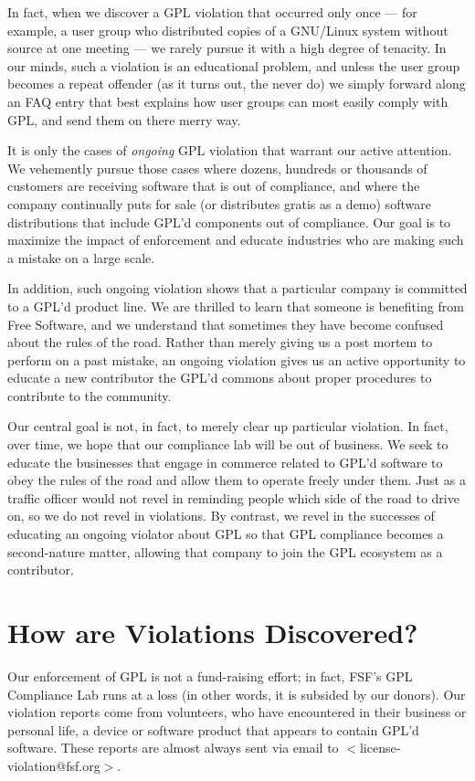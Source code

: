 \documentclass[12pt]{report}
\begin{document}
In fact, when we discover a GPL violation that occurred only once --- for
example, a user group who distributed copies of a GNU/Linux system without
source at one meeting --- we rarely pursue it with a high degree of
tenacity.  In our minds, such a violation is an educational problem, and
unless the user group becomes a repeat offender (as it turns out, the
never do) we simply forward along an FAQ entry that best explains how user
groups can most easily comply with GPL, and send them on there merry way.

It is only the cases of {\em ongoing\/} GPL violation that warrant our
active attention.  We vehemently pursue those cases where dozens, hundreds
or thousands of customers are receiving software that is out of
compliance, and where the company continually puts for sale (or
distributes gratis as a demo) software distributions that include GPL'd
components out of compliance.  Our goal is to maximize the impact of
enforcement and educate industries who are making such a mistake on a
large scale.

In addition, such ongoing violation shows that a particular company is
committed to a GPL'd product line.  We are thrilled to learn that someone
is benefiting from Free Software, and we understand that sometimes they
have become confused about the rules of the road.  Rather than merely
giving us a post mortem to perform on a past mistake, an ongoing violation
gives us an active opportunity to educate a new contributor the GPL'd
commons about proper procedures to contribute to the community.

Our central goal is not, in fact, to merely clear up particular violation.
In fact, over time, we hope that our compliance lab will be out of
business.  We seek to educate the businesses that engage in commerce
related to GPL'd software to obey the rules of the road and allow them to
operate freely under them.  Just as a traffic officer would not revel in
reminding people which side of the road to drive on, so we do not revel in
violations.  By contrast, we revel in the successes of educating an
ongoing violator about GPL so that GPL compliance becomes a second-nature
matter, allowing that company to join the GPL ecosystem as a contributor.

\section{How are Violations Discovered?}

Our enforcement of GPL is not a fund-raising effort; in fact, FSF's GPL
Compliance Lab runs at a loss (in other words, it is subsided by our
donors).  Our violation reports come from volunteers, who have encountered
in their business or personal life, a device or software product that
appears to contain GPL'd software.  These reports are almost always sent
via email to $<$license-violation@fsf.org$>$.
\end{document}

